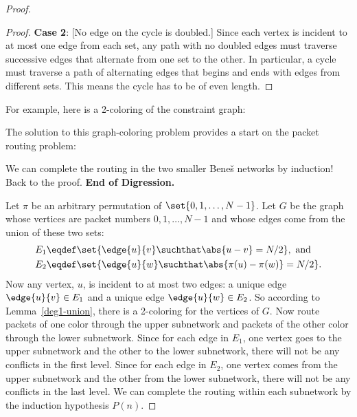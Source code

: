 \begin{proof}
\begin{proof}
  \textbf{Case 2}: [No edge on the cycle is doubled.]  Since each vertex
  is incident to at most one edge from each set, any path with no doubled
  edges must traverse successive edges that alternate from one set to the
  other.  In particular, a cycle must traverse a path of alternating edges
  that begins and ends with edges from different sets.  This means the
  cycle has to be of even length.
\end{proof}

For example, here is a 2-coloring of the constraint graph:

\begin{center}
\end{center}

The solution to this graph-coloring problem provides a start
on the packet routing problem:

We can complete the routing in the two smaller Bene\v{s} networks by
induction!  Back to the proof.  \textbf{End of Digression.}

Let $\pi$ be an arbitrary permutation of $\set{0, 1, \dots, N-1}$.  Let $G$
be the graph whose vertices are packet numbers $0, 1, \dots, N-1$ and whose edges
come from the union of these two sets:
\begin{align*}
E_1 \eqdef &  \set{\edge{u}{v} \suchthat \abs{u - v} = N/2},\ \text{and} \\
E_2 \eqdef &  \set{\edge{u}{w} \suchthat \abs{\pi(u) - \pi(w)} = N/2}.
\end{align*}
Now any vertex, $u$, is incident to at most two edges: a unique edge
$\edge{u}{v} \in E_1$ and a unique edge $\edge{u}{w} \in E_2$.  So
according to Lemma~\ref{deg1-union}, there is a 2-coloring for the
vertices of $G$.  Now route packets of one color through the upper
subnetwork and packets of the other color through the lower subnetwork.
Since for each edge in $E_1$, one vertex goes to the upper subnetwork and
the other to the lower subnetwork, there will not be any conflicts in the
first level.  Since for each edge in $E_2$, one vertex comes from the
upper subnetwork and the other from the lower subnetwork, there will not
be any conflicts in the last level.  We can complete the routing within
each subnetwork by the induction hypothesis $P(n)$.
\end{proof}

\begin{problems}
\examproblems
{}

\classproblems
{}

\homeworkproblems
{}
\end{problems}

\iffalse
In class, you will work through an example in which you route packets
using this recursive idea!
\fi

\endinput

